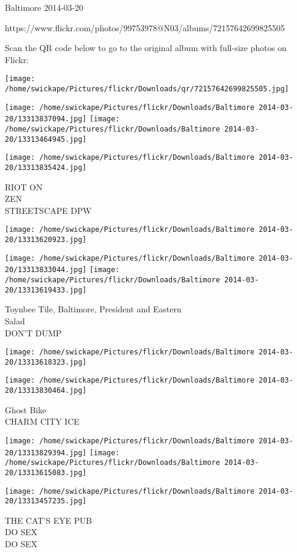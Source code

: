 \documentclass[10pt,letterpaper]{article}
\begin{document}
Baltimore 2014-03-20

https://www.flickr.com/photos/99753978@N03/albums/72157642699825505

Scan the QR code below to go to the original album with full-size photos on Flickr:

\texttt{[image: /home/swickape/Pictures/flickr/Downloads/qr/72157642699825505.jpg]}
\pagebreak

\texttt{[image: /home/swickape/Pictures/flickr/Downloads/Baltimore 2014-03-20/13313837094.jpg]}
\texttt{[image: /home/swickape/Pictures/flickr/Downloads/Baltimore 2014-03-20/13313464945.jpg]}

\vspace{0.25in}
\texttt{[image: /home/swickape/Pictures/flickr/Downloads/Baltimore 2014-03-20/13313835424.jpg]}

RIOT ON\\
ZEN\\
STREETSCAPE DPW
\pagebreak

\texttt{[image: /home/swickape/Pictures/flickr/Downloads/Baltimore 2014-03-20/13313620923.jpg]}

\vspace{0.25in}
\texttt{[image: /home/swickape/Pictures/flickr/Downloads/Baltimore 2014-03-20/13313833044.jpg]}
\texttt{[image: /home/swickape/Pictures/flickr/Downloads/Baltimore 2014-03-20/13313619433.jpg]}

Toynbee Tile, Baltimore, President and Eastern\\
Salad\\
DON'T DUMP
\pagebreak

\texttt{[image: /home/swickape/Pictures/flickr/Downloads/Baltimore 2014-03-20/13313618323.jpg]}

\vspace{0.25in}
\texttt{[image: /home/swickape/Pictures/flickr/Downloads/Baltimore 2014-03-20/13313830464.jpg]}

Ghost Bike\\
CHARM CITY ICE
\pagebreak

\texttt{[image: /home/swickape/Pictures/flickr/Downloads/Baltimore 2014-03-20/13313829394.jpg]}
\texttt{[image: /home/swickape/Pictures/flickr/Downloads/Baltimore 2014-03-20/13313615083.jpg]}

\texttt{[image: /home/swickape/Pictures/flickr/Downloads/Baltimore 2014-03-20/13313457235.jpg]}

THE CAT'S EYE PUB\\
DO SEX\\
DO SEX
\pagebreak
\end{document}
